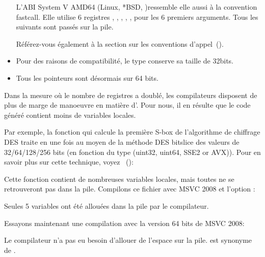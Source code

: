\begin{itemize}
L'ABI System V AMD64 (Linux, *BSD, \MacOSX)\SysVABI ressemble elle aussi à la convention fastcall.
Elle utilise 6 registres \RDI, \RSI, \RDX, \RCX, ,  pour les 6 premiers arguments. 
Tous les suivants sont passés sur la pile.

Référez-vous également à la section sur les conventions d'appel~().

\item
Pour des raisons de compatibilité, le type \CCpp \Tint conserve sa taille de 32bits.

\item
Tous les pointeurs sont désormais sur 64 bits.

\end{itemize}


Dans la mesure où le nombre de registres a doublé, les compilateurs disposent de plus de marge 
de manoeuvre en matière d'. 
Pour nous, il en résulte que le code généré contient moins de variables locales.


Par exemple, la fonction qui calcule la première S-box de l'algorithme de chiffrage DES traite 
en une fois au moyen de la méthode DES bitslice des valeurs de 32/64/128/256 bits (en fonction 
du type  (uint32, uint64, SSE2 or AVX)).
Pour en savoir plus sur cette technique, voyez ~():



Cette fonction contient de nombreuses variables locales, mais toutes ne se retrouveront pas dans 
la pile. Compilons ce fichier avec MSVC 2008 et l'option :



Seules 5 variables ont été allouées dans la pile par le compilateur.

Essayons maintenant une compilation avec la version 64 bits de MSVC 2008:



Le compilateur n'a pas eu besoin d'allouer de l'espace sur la pile.  est synonyme de .

\iffalse

